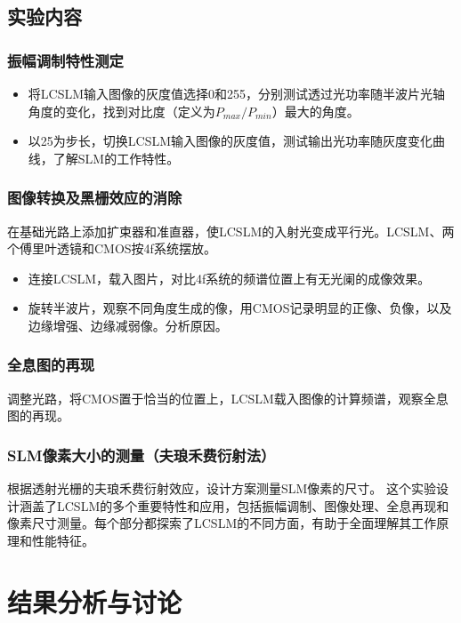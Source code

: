\documentclass[11pt,a4paper]{article}
\begin{document}
\subsection{实验内容}
\subsubsection{振幅调制特性测定}
\begin{itemize}
\item 将LCSLM输入图像的灰度值选择0和255，分别测试透过光功率随半波片光轴角度的变化，找到对比度（定义为$P_{max}/P_{min}$）最大的角度。
\item 以25为步长，切换LCSLM输入图像的灰度值，测试输出光功率随灰度变化曲线，了解SLM的工作特性。
\end{itemize}
\subsubsection{图像转换及黑栅效应的消除}
在基础光路上添加扩束器和准直器，使LCSLM的入射光变成平行光。LCSLM、两个傅里叶透镜和CMOS按4f系统摆放。
\begin{itemize}
\item 连接LCSLM，载入图片，对比4f系统的频谱位置上有无光阑的成像效果。
\item 旋转半波片，观察不同角度生成的像，用CMOS记录明显的正像、负像，以及边缘增强、边缘减弱像。分析原因。
\end{itemize}
\subsubsection{全息图的再现}
调整光路，将CMOS置于恰当的位置上，LCSLM载入图像的计算频谱，观察全息图的再现。
\subsubsection{SLM像素大小的测量（夫琅禾费衍射法）}
根据透射光栅的夫琅禾费衍射效应，设计方案测量SLM像素的尺寸。
这个实验设计涵盖了LCSLM的多个重要特性和应用，包括振幅调制、图像处理、全息再现和像素尺寸测量。每个部分都探索了LCSLM的不同方面，有助于全面理解其工作原理和性能特征。
\section{结果分析与讨论}
\end{document}
